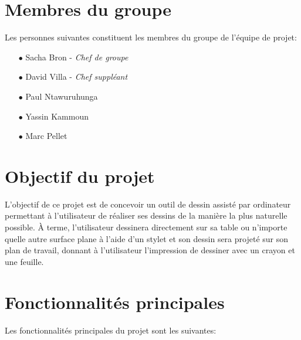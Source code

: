 \documentclass[11pt,a4paper,oldfontcommands]{memoir}
\begin{document}
\section{Membres du groupe}

Les personnes suivantes constituent les membres du groupe de l'équipe de projet:

\begin{itemize}
\item[$\bullet$] Sacha Bron - \textit{Chef de groupe}
\item[$\bullet$] David Villa - \textit{Chef suppléant}
\item[$\bullet$] Paul Ntawuruhunga
\item[$\bullet$] Yassin Kammoun
\item[$\bullet$] Marc Pellet
\end{itemize}

\section{Objectif du projet}

L'objectif de ce projet est de concevoir un outil de dessin assisté par ordinateur permettant à l'utilisateur de réaliser ses dessins de la manière la plus naturelle possible. À terme, l'utilisateur dessinera directement sur sa table ou n'importe quelle autre surface plane à l'aide d'un stylet et son dessin sera projeté sur son plan de travail, donnant à l'utilisateur l'impression de dessiner avec un crayon et une feuille.

\section{Fonctionnalités principales}

Les fonctionnalités principales du projet sont les suivantes:
\end{document}

